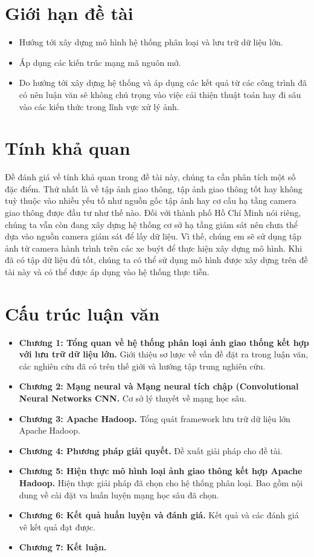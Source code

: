 \section*{Giới hạn đề tài}
\begin{itemize}
	\item Hướng tới xây dựng mô hình hệ thống phân loại và lưu trữ dữ liệu lớn.
	\item Áp dụng các kiến trúc mạng mã nguôn mở.
	\item Do hướng tới xây dựng hệ thống và áp dụng các kết quả từ các công trình đã có nên luận văn sẽ không chú trọng vào việc cải thiện thuật toán hay đi sâu vào các kiến thức trong lĩnh vực xử lý ảnh.
\end{itemize}

\section*{Tính khả quan}
	Đề đánh giá về tính khả quan trong đề tài này, chúng ta cần phân tích một số đặc điểm. Thứ nhất là về tập ảnh giao thông, tập ảnh giao thông tốt hay không tuỳ thuộc vào nhiều yếu tố như nguồn gốc tập ảnh hay cơ cấu hạ tầng camera giao thông được đầu tư như thế nào. Đối với thành phố Hồ Chí Minh nói riêng, chúng ta vẫn còn đang xây dựng hệ thống cơ sở hạ tầng giám sát nên chưa thể dựa vào nguồn camera giám sát để lấy dữ liệu. Vì thế, chúng em sẽ sử dụng tập ảnh từ camera hành trình trên các xe buýt để thực hiện xây dựng mô hình. Khi đã có tập dữ liệu đủ tốt, chúng ta có thể sử dụng mô hình được xây dựng trên đề tài này và có thể được áp dụng vào hệ thống thực tiễn.

\section*{Cấu trúc luận văn}
\begin{itemize}
	\item \textbf{Chương 1: Tổng quan về hệ thống phân loại ảnh giao thống kết hợp với lưu trữ dữ liệu lớn.} Giới thiệu sơ lược về vấn đề đặt ra trong luận văn, các nghiên cứu đã có trên thế giới và hướng tập trung nghiên cứu.
	\item \textbf{Chương 2: Mạng neural và Mạng neural tích chập (Convolutional Neural Networks CNN.} Cơ sở lý thuyết về mạng học sâu.
	\item \textbf{Chương 3: Apache Hadoop.} Tổng quát framework lưu trữ dữ liệu lớn Apache Hadoop.
	\item \textbf{Chương 4: Phương pháp giải quyết.} Đề xuất giải pháp cho đề tài.
	\item \textbf{Chương 5: Hiện thực mô hình loại ảnh giao thông kết hợp Apache Hadoop. }Hiện thực giải pháp đã chọn cho hệ thống phân loại. Bao gồm nội dung về cài đặt va huấn luyện mạng học sâu đã chọn.
	\item \textbf{Chương 6: Kết quả huấn luyện và đánh giá.} Kết quả và các đánh giá vê kết quả đạt được.
	\item \textbf{Chương 7: Kết luận.}
\end{itemize}